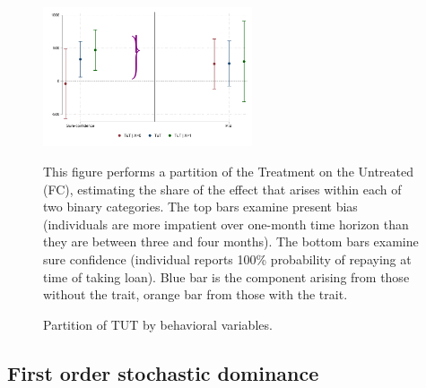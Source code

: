 \begin{figure}[H]
    \caption{Partition of TUT by behavioral variables.}
    \label{tut_beh_partition}
    \begin{center}
        \centering
        \includegraphics[width=0.55\textwidth]{Figuras/tut_beh_partition.pdf} 
    \end{center}
     \scriptsize  This figure performs a partition of the Treatment on the Untreated (FC), estimating the share of the effect that arises within each of two binary categories.  The top bars examine present bias (individuals are more impatient over one-month time horizon than they are between three and four months).  The bottom bars examine sure confidence (individual reports 100\% probability of repaying at time of taking loan).  Blue bar is the component arising from those without the trait, orange bar from those with the trait. 

\end{figure}


\vspace{.3in}
\subsection{First order stochastic dominance} \label{App_FOSD}
\normalsize
\vspace{.2in}


